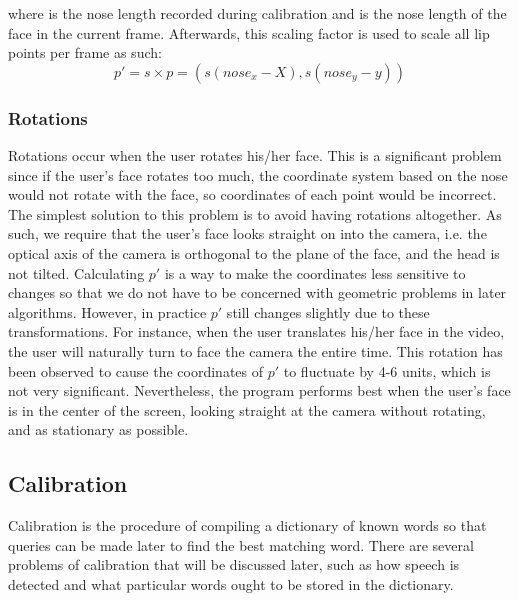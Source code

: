 \documentclass[10pt,twocolumn,letterpaper]{article}
\begin{document}
where  is the nose length recorded during calibration and  is the nose length of the face in the current frame. Afterwards, this scaling factor is used to scale all lip points per frame as such:
\begin{equation}
  p' = s \times p = (s(nose_x - X), s(nose_y - y))
\end{equation}
\subsubsection{Rotations}
Rotations occur when the user rotates his/her face. This is a significant problem since if the user’s face rotates too much, the coordinate system based on the nose would not rotate with the face, so coordinates of each point would be incorrect. The simplest solution to this problem is to avoid having rotations altogether. As such, we require that the user’s face looks straight on into the camera, i.e. the optical axis of the camera is orthogonal to the plane of the face, and the head is not tilted.
Calculating $p'$ is a way to make the coordinates less sensitive to changes so that we do not have to be concerned with geometric problems in later algorithms.
However, in practice $p'$ still changes slightly due to these transformations. For instance, when the user translates his/her face in the video, the user will naturally turn to face the camera the entire time. This rotation has been observed to cause the coordinates of $p'$ to fluctuate by 4-6 units, which is not very significant.
Nevertheless, the program performs best when the user’s face is in the center of the screen, looking straight at the camera without rotating, and as stationary as possible.
\subsection{Calibration}
Calibration is the procedure of compiling a dictionary of known words so that queries can be made later to find the best matching word. There are several problems of calibration that will be discussed later, such as how speech is detected and what particular words ought to be stored in the dictionary.
\end{document}
